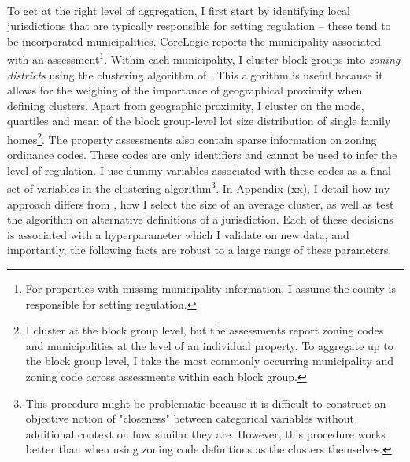 \documentclass[11pt]{article}
\begin{document}
	 \paragraph*{} 
	 To get at the right level of aggregation, I first start by identifying local jurisdictions that are typically responsible for setting regulation -- these tend to be incorporated municipalities. CoreLogic reports the municipality associated with an assessment\footnote{For properties with missing municipality information, I assume the county is responsible for setting regulation.}. Within each municipality, I cluster block groups into \textit{zoning districts} using the clustering algorithm of \cite{Chavent2018}. This algorithm is useful because it allows for the weighing of the importance of geographical proximity when defining clusters. Apart from geographic proximity, I cluster on the mode, quartiles and mean of the block group-level lot size distribution of single family homes\footnote{I cluster at the block group level, but the assessments report zoning codes and municipalities at the level of an individual property. To aggregate up to the block group level, I take the most commonly occurring municipality and zoning code across assessments within each block group.}. The property assessments also contain sparse information on zoning ordinance codes. These codes are only identifiers and cannot be used to infer the level of regulation. I use dummy variables associated with these codes as a final set of variables in the clustering algorithm\footnote{This procedure might be problematic because it is difficult to construct an objective notion of "closeness" between categorical variables without additional context on how similar they are. However, this procedure works better than when using zoning code definitions as the clusters themselves.}. In Appendix (xx), I detail how my approach differs from \cite{Song}, how I select the size of an average cluster, as well as test the algorithm on alternative definitions of a jurisdiction. Each of these decisions is associated with a hyperparameter which I validate on new data, and importantly, the following facts are robust to a large range of these parameters. 
	 
\end{document}
